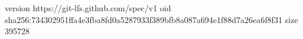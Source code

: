 version https://git-lfs.github.com/spec/v1
oid sha256:734302951ffa4e3fba8fd0a5287933f389bfb8a087a694e1f88d7a26ea6f8f31
size 395728
